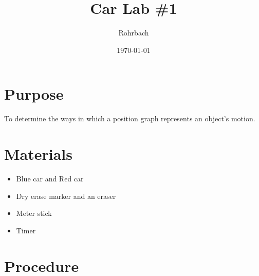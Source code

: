 \documentclass[10pt]{exam}
\title{Car Lab \#1}
\author{Rohrbach}
\date{\today}
\begin{document}
\maketitle

\section*{Purpose}

To determine the ways in which a position graph represents an object's motion.

\section*{Materials}

\begin{itemize}
  \item Blue car and Red car
  \item Dry erase marker and an eraser
  \item Meter stick 
  \item	Timer
\end{itemize}

\section*{Procedure}


\end{document}
